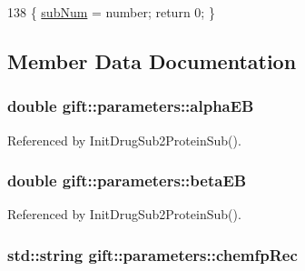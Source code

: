 \begin{DoxyCode}
138 \{ \hyperlink{classgift_1_1parameters_a3736b9054e162bc4bf63d018744ff0c3}{subNum} = number; \textcolor{keywordflow}{return} 0; \}
\end{DoxyCode}


\subsection{Member Data Documentation}
\subsubsection[{\texorpdfstring{alpha\+EB}{alphaEB}}]{\setlength{\rightskip}{0pt plus 5cm}double gift\+::parameters\+::alpha\+EB}\hypertarget{classgift_1_1parameters_adbe3588acaf5006d064586809ffa3d28}{}\label{classgift_1_1parameters_adbe3588acaf5006d064586809ffa3d28}


Referenced by Init\+Drug\+Sub2\+Protein\+Sub().

\subsubsection[{\texorpdfstring{beta\+EB}{betaEB}}]{\setlength{\rightskip}{0pt plus 5cm}double gift\+::parameters\+::beta\+EB}\hypertarget{classgift_1_1parameters_a5c4260c7b30043ee69799d31d3a2a78e}{}\label{classgift_1_1parameters_a5c4260c7b30043ee69799d31d3a2a78e}


Referenced by Init\+Drug\+Sub2\+Protein\+Sub().

\subsubsection[{\texorpdfstring{chemfp\+Rec}{chemfpRec}}]{\setlength{\rightskip}{0pt plus 5cm}std\+::string gift\+::parameters\+::chemfp\+Rec}\hypertarget{classgift_1_1parameters_a87d9659a5c46d7075e8a795b51b7ce82}{}\label{classgift_1_1parameters_a87d9659a5c46d7075e8a795b51b7ce82}
